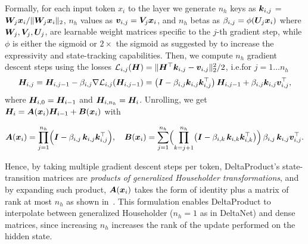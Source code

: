 \documentclass{article} %
\begin{document}
Formally, for each input token $x_i$ to the layer we generate $n_h$ keys as ${\bm{k}}_{i,j}$ = ${\bm{W}}_j {\bm{x}}_i/\lVert {\bm{W}}_j {\bm{x}}_i \rVert_2$, $n_h$ values as ${\bm{v}}_{i,j} = {\bm{V}}_j {\bm{x}}_i$, and $n_h$ betas as $\beta_{i,j} = \phi({\bm{U}}_j {\bm{x}}_i)$  where ${\bm{W}}_j, {\bm{V}}_j, {\bm{U}}_j$,  are learnable weight matrices specific to the $j$-th gradient step, while $\phi$ is either the sigmoid or $2 \times$ the sigmoid as suggested by \citet{grazzi-iclr25a} to increase the expressivity and state-tracking capabilities. Then, we compute $n_h$ gradient descent steps using the losses $\mathcal{L}_{i,j}({\bm{H}}) =\|{\bm{H}}^\top{\bm{k}}_{i,j} - {\bm{v}}_{i,j}\|_2^2/2$, i.e.\@ for $j=1\dots n_h$
\begin{align*}
    {\bm{H}}_{i, j} =  {\bm{H}}_{i,j-1} - \beta_{i, j} \nabla \mathcal{L}_{i,j}({\bm{H}}_{i,j-1})  
    = \left({\bm{I}} - \beta_{i, j} {\bm{k}}_{i, j} {\bm{k}}_{i, j}^\top\right) {\bm{H}}_{i,j-1} + \beta_{i, j} {\bm{k}}_{i, j} {\bm{v}}_{i, j}^\top,
\end{align*}
where ${\bm{H}}_{i,0} = {\bm{H}}_{i-1}$ and ${\bm{H}}_{i, n_h} = {\bm{H}}_i$. Unrolling, we get ${\bm{H}}_i = {\bm{A}}({\bm{x}}_i) {\bm{H}}_{i-1} + {\bm{B}}({\bm{x}}_i)$ with
\begin{tcolorbox}[
  colback=white!3!white,
  colframe=red,
  boxrule=0.5pt,
  arc=2mm,
  left=1mm,
  right=1mm,
  top=-2.6mm,
  bottom=0mm]
\[
{\bm{A}}({\bm{x}}_i) = \prod_{j=1}^{n_h} \Bigl({\bm{I}} - \beta_{i,j}\,{\bm{k}}_{i,j}{\bm{k}}_{i,j}^\top\Bigr), \quad
{\bm{B}}({\bm{x}}_i) = \sum_{j=1}^{n_h} \Bigl(\prod_{k=j+1}^{n_h} \bigl({\bm{I}} - \beta_{i,k}\,{\bm{k}}_{i,k}{\bm{k}}_{i,k}^\top\bigr)\Bigr)\,\beta_{i,j}\,{\bm{k}}_{i,j}{\bm{v}}_{i,j}^\top.
\]
\end{tcolorbox}

Hence, by taking multiple gradient descent steps per token, DeltaProduct's state-transition matrices are \textit{products of generalized Householder transformations}, and by expanding such product, ${\bm{A}}({\bm{x}}_i)$ takes the form of identity plus a matrix of rank at most $n_h$ as shown in~. 
This formulation enables DeltaProduct to interpolate between generalized Householder ($n_h = 1$ as in DeltaNet) and dense 
matrices, since increasing $n_h$ increases the rank of the update performed on the hidden state.
\end{document}
